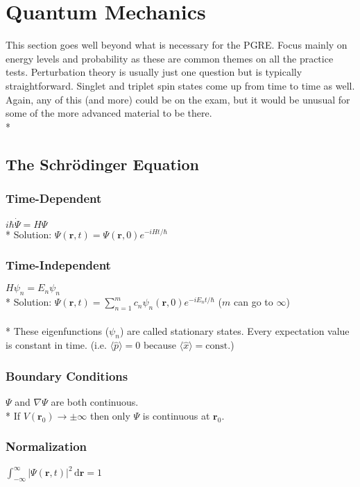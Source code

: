 \section{Quantum Mechanics}

This section goes well beyond what is necessary for the PGRE.
Focus mainly on energy levels and probability as these are common themes on all the practice tests.
Perturbation theory is usually just one question but is typically straightforward.
Singlet and triplet spin states come up from time to time as well.
Again, any of this (and more) could be on the exam, but it would be unusual for some of the more advanced material to be there.\\*

\subsection{The Schr\"odinger Equation}

\subsubsection{Time-Dependent}
\(i\hbar\dot{\Psi}=H\Psi\)\\*
Solution: \(\Psi(\mathbf{r},t)=\Psi(\mathbf{r},0)e^{-iHt/\hbar}\)

\subsubsection{Time-Independent}
\(H\psi_n=E_n\psi_n\)\\*
Solution: \(\displaystyle\Psi(\mathbf{r},t)=\sum_{n=1}^{m}c_n\psi_n(\mathbf{r},0)e^{-iE_nt/\hbar}\) (\(m\) can go to \(\infty\))\\\\*
These eigenfunctions (\(\psi_n\)) are called stationary states.
Every expectation value is constant in time. (i.e. \(\langle\hat{p}\rangle=0\) because \(\langle \hat{x}\rangle=\mathrm{const.}\))

\subsubsection{Boundary Conditions}
\(\Psi\) and \(\nabla\Psi\) are both continuous.\\*
If \(V(\mathbf{r}_0)\to\pm\infty\) then only \(\Psi\) is continuous at \(\mathbf{r}_0\).

\subsubsection{Normalization}
\(\int_{-\infty}^{\infty}|\Psi(\mathbf{r},t)|^2\,\mathrm{d}\mathbf{r}=1\)


